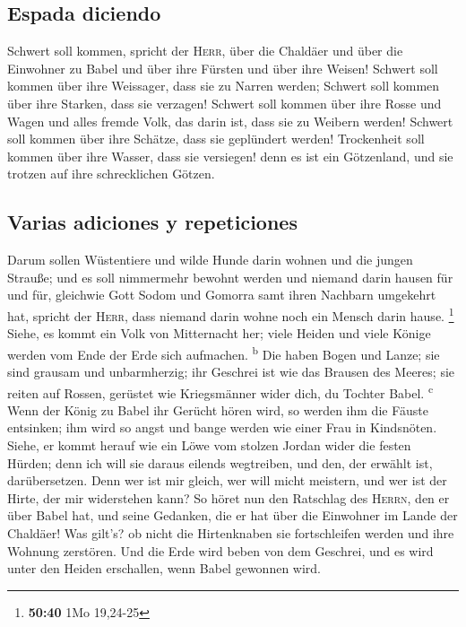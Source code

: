 \hypertarget{espada-diciendo}{%
\subsection{Espada diciendo}\label{espada-diciendo}}

 Schwert soll kommen, spricht der \textsc{Herr}, über die
Chaldäer und über die Einwohner zu Babel und über ihre Fürsten und über
ihre Weisen!  Schwert soll kommen über ihre Weissager,
dass sie zu Narren werden; Schwert soll kommen über ihre Starken, dass
sie verzagen!  Schwert soll kommen über ihre Rosse und
Wagen und alles fremde Volk, das darin ist, dass sie zu Weibern werden!
Schwert soll kommen über ihre Schätze, dass sie geplündert werden!
 Trockenheit soll kommen über ihre Wasser, dass sie
versiegen! denn es ist ein Götzenland, und sie trotzen auf ihre
schrecklichen Götzen.

\hypertarget{varias-adiciones-y-repeticiones}{%
\subsection{Varias adiciones y
repeticiones}\label{varias-adiciones-y-repeticiones}}

 Darum sollen Wüstentiere und wilde Hunde darin wohnen
und die jungen Strauße; und es soll nimmermehr bewohnt werden und
niemand darin hausen für und für,  gleichwie Gott Sodom
und Gomorra samt ihren Nachbarn umgekehrt hat, spricht der
\textsc{Herr}, dass niemand darin wohne noch ein Mensch darin hause.
\footnote{\textbf{50:40} 1Mo 19,24-25}  Siehe, es kommt
ein Volk von Mitternacht her; viele Heiden und viele Könige werden vom
Ende der Erde sich aufmachen. \textsuperscript{b}  Die
haben Bogen und Lanze; sie sind grausam und unbarmherzig; ihr Geschrei
ist wie das Brausen des Meeres; sie reiten auf Rossen, gerüstet wie
Kriegsmänner wider dich, du Tochter Babel. \textsuperscript{c}
 Wenn der König zu Babel ihr Gerücht hören wird, so
werden ihm die Fäuste entsinken; ihm wird so angst und bange werden wie
einer Frau in Kindsnöten.  Siehe, er kommt herauf wie ein
Löwe vom stolzen Jordan wider die festen Hürden; denn ich will sie
daraus eilends wegtreiben, und den, der erwählt ist, darübersetzen. Denn
wer ist mir gleich, wer will micht meistern, und wer ist der Hirte, der
mir widerstehen kann?  So höret nun den Ratschlag des
\textsc{Herrn}, den er über Babel hat, und seine Gedanken, die er hat
über die Einwohner im Lande der Chaldäer! Was gilt's? ob nicht die
Hirtenknaben sie fortschleifen werden und ihre Wohnung zerstören.
 Und die Erde wird beben von dem Geschrei, und es wird
unter den Heiden erschallen, wenn Babel gewonnen wird.

